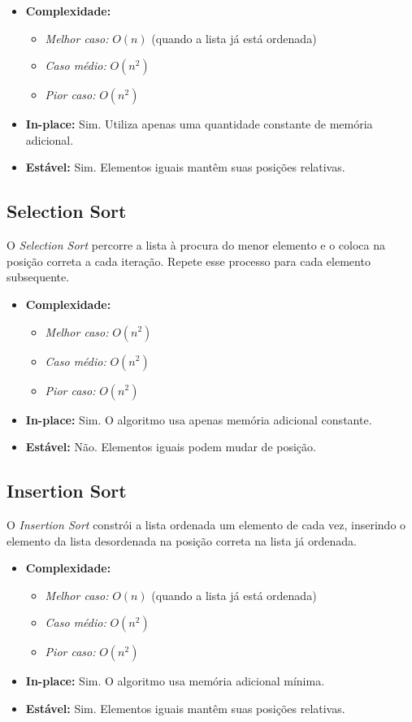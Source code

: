 \documentclass[12pt,a4paper]{article}
\begin{document}
\begin{itemize}
    \item \textbf{Complexidade:}
    \begin{itemize}
        \item \textit{Melhor caso:} $O(n)$ (quando a lista já está ordenada)
        \item \textit{Caso médio:} $O(n^2)$
        \item \textit{Pior caso:} $O(n^2)$
    \end{itemize}
    \item \textbf{In-place:} Sim. Utiliza apenas uma quantidade constante de memória adicional.
    \item \textbf{Estável:} Sim. Elementos iguais mantêm suas posições relativas.
\end{itemize}

\subsection{Selection Sort}
O \textit{Selection Sort} percorre a lista à procura do menor elemento e o coloca na posição correta a cada iteração. Repete esse processo para cada elemento subsequente.

\begin{itemize}
    \item \textbf{Complexidade:}
    \begin{itemize}
        \item \textit{Melhor caso:} $O(n^2)$
        \item \textit{Caso médio:} $O(n^2)$
        \item \textit{Pior caso:} $O(n^2)$
    \end{itemize}
    \item \textbf{In-place:} Sim. O algoritmo usa apenas memória adicional constante.
    \item \textbf{Estável:} Não. Elementos iguais podem mudar de posição.
\end{itemize}

\subsection{Insertion Sort}
O \textit{Insertion Sort} constrói a lista ordenada um elemento de cada vez, inserindo o elemento da lista desordenada na posição correta na lista já ordenada.

\begin{itemize}
    \item \textbf{Complexidade:}
    \begin{itemize}
        \item \textit{Melhor caso:} $O(n)$ (quando a lista já está ordenada)
        \item \textit{Caso médio:} $O(n^2)$
        \item \textit{Pior caso:} $O(n^2)$
    \end{itemize}
    \item \textbf{In-place:} Sim. O algoritmo usa memória adicional mínima.
    \item \textbf{Estável:} Sim. Elementos iguais mantêm suas posições relativas.
\end{itemize}
\end{document}
